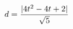 \documentclass[preview]{standalone}
\begin{document}
\begin{align*}
\special{dvisvgm:raw <g id='unique000'>}d=\frac{|4t^2-4t+2|}{\sqrt{5}}\special{dvisvgm:raw </g>}
\end{align*}
\end{document}

